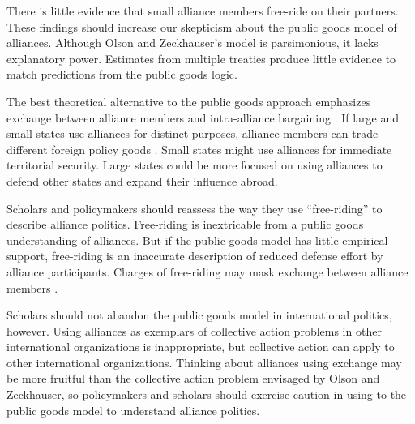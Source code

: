 \documentclass[12pt]{article}
\begin{document}
There is little evidence that small alliance members free-ride on their partners. 
These findings should increase our skepticism about the public goods model of alliances. 
Although Olson and Zeckhauser's model is parsimonious, it lacks explanatory power. 
Estimates from multiple treaties produce little evidence to match predictions from the public goods logic. 


The best theoretical alternative to the public goods approach emphasizes exchange between alliance members and intra-alliance bargaining \citep{Norrlof2010, Brooksetal2013, Kim2016}. 
If large and small states use alliances for distinct purposes, alliance members can trade different foreign policy goods \citep{Morrow1991, Johnson2015}. 
Small states might use alliances for immediate territorial security. 
Large states could be more focused on using alliances to defend other states and expand their influence abroad. 


Scholars and policymakers should reassess the way they use ``free-riding'' to describe alliance politics. 
Free-riding is inextricable from a public goods understanding of alliances.
But if the public goods model has little empirical support, free-riding is an inaccurate description of reduced defense effort by alliance participants.  
Charges of free-riding may mask exchange between alliance members \citep{Lanoszka2015}. 


Scholars should not abandon the public goods model in international politics, however.   
Using alliances as exemplars of collective action problems in other international organizations is inappropriate, but collective action can apply to other international organizations. 
Thinking about alliances using exchange may be more fruitful than the collective action problem envisaged by Olson and Zeckhauser, so policymakers and scholars should exercise caution in using to the public goods model to understand alliance politics.  



\singlespace


 
\end{document}
